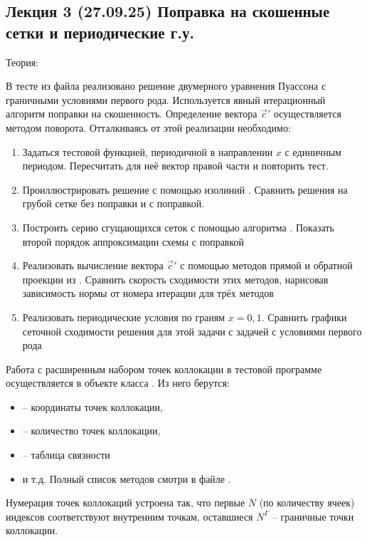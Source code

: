 \subsection{Лекция 3 (27.09.25) Поправка на скошенные сетки и периодические г.у.}
Теория: 

В тесте  из файла 
реализовано решение двумерного уравнения Пуассона с граничными условиями первого рода.
Используется явный итерационный алгоритм поправки на скошенность.
Определение вектора $\vec c'$ осуществляется методом поворота.
Отталкиваясь от этой реализации необходимо:
\begin{enumerate}
\item Задаться тестовой функцией, периодичной в направлении $x$ с единичным периодом. Пересчитать для неё вектор правой части и повторить тест.
\item Проиллюстрировать решение с помощью изолиний . Сравнить решения на грубой сетке без поправки и с поправкой.
\item Построить серию сгущающихся сеток с помощью алгоритма . Показать второй порядок аппроксимации схемы с поправкой
\item Реализовать вычисление вектора $\vec c'$ с помощью методов прямой и обратной проекции из .
      Сравнить скорость сходимости этих методов, нарисовав зависимость нормы от номера итерации для трёх методов
\item Реализовать периодические условия по граням $x=0,1$. Сравнить графики сеточной сходимости решения для этой задачи с задачей с условиями первого рода
\end{enumerate}

Работа с расширенным набором точек коллокации в тестовой программе
осуществляется в объекте  класса .
Из него берутся:
\begin{itemize}
\item {} -- координаты точек коллокации,
\item {} -- количество точек коллокации,
\item {} -- таблица связности 
\item и т.д. Полный список методов смотри в файле .
\end{itemize}

Нумерация точек коллокаций устроена так, что первые $N$ (по количеству ячеек) индексов соответствуют внутренним точкам,
оставшиеся $N^\Gamma$ -- граничные точки коллокации.

